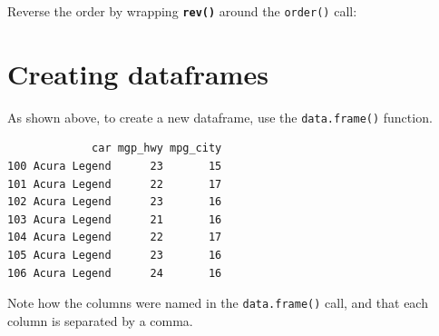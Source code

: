 \documentclass[
]{book}
\newenvironment{Shaded}{\begin{snugshade}}{\end{snugshade}}
\newcommand{\DecValTok}[1]{\textcolor[rgb]{0.00,0.00,0.81}{#1}}
\newcommand{\FunctionTok}[1]{\textcolor[rgb]{0.13,0.29,0.53}{\textbf{#1}}}
\newcommand{\NormalTok}[1]{#1}
\newcommand{\OtherTok}[1]{\textcolor[rgb]{0.56,0.35,0.01}{#1}}
\newcommand{\SpecialCharTok}[1]{\textcolor[rgb]{0.81,0.36,0.00}{\textbf{#1}}}
\begin{document}
Reverse the order by wrapping \textbf{\texttt{rev()}} around the \texttt{order()} call:

\begin{Shaded}
\end{Shaded}

\section*{Creating dataframes}\label{creating-dataframes}

As shown above, to create a new dataframe, use the \texttt{data.frame()} function.

\begin{verbatim}
             car mgp_hwy mpg_city
100 Acura Legend      23       15
101 Acura Legend      22       17
102 Acura Legend      23       16
103 Acura Legend      21       16
104 Acura Legend      22       17
105 Acura Legend      23       16
106 Acura Legend      24       16
\end{verbatim}

Note how the columns were named in the \texttt{data.frame()} call, and that each column is separated by a comma.
\end{document}
